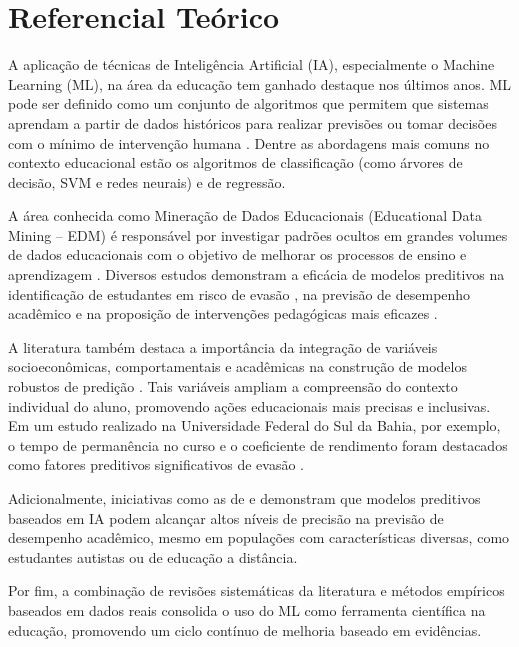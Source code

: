 \documentclass[12pt]{article}
\begin{document}
\section{Referencial Teórico}
A aplicação de técnicas de Inteligência Artificial (IA), especialmente o Machine Learning (ML), na área da educação tem ganhado destaque nos últimos anos. ML pode ser definido como um conjunto de algoritmos que permitem que sistemas aprendam a partir de dados históricos para realizar previsões ou tomar decisões com o mínimo de intervenção humana \cite{Mitchell1997, Goodfellow2016}. Dentre as abordagens mais comuns no contexto educacional estão os algoritmos de classificação (como árvores de decisão, SVM e redes neurais) e de regressão.

A área conhecida como Mineração de Dados Educacionais (Educational Data Mining – EDM) é responsável por investigar padrões ocultos em grandes volumes de dados educacionais com o objetivo de melhorar os processos de ensino e aprendizagem \cite{FilhoVinutoLeal2020}. Diversos estudos demonstram a eficácia de modelos preditivos na identificação de estudantes em risco de evasão \cite{Kantorski2016, Bastos2024}, na previsão de desempenho acadêmico \cite{FernandezGarcia2021} e na proposição de intervenções pedagógicas mais eficazes \cite{Najera2018}.

A literatura também destaca a importância da integração de variáveis socioeconômicas, comportamentais e acadêmicas na construção de modelos robustos de predição \cite{Matz2023}. Tais variáveis ampliam a compreensão do contexto individual do aluno, promovendo ações educacionais mais precisas e inclusivas. Em um estudo realizado na Universidade Federal do Sul da Bahia, por exemplo, o tempo de permanência no curso e o coeficiente de rendimento foram destacados como fatores preditivos significativos de evasão \cite{Bastos2024}.

Adicionalmente, iniciativas como as de \cite{Bakker2023} e \cite{Cabrera2023} demonstram que modelos preditivos baseados em IA podem alcançar altos níveis de precisão na previsão de desempenho acadêmico, mesmo em populações com características diversas, como estudantes autistas ou de educação a distância.

Por fim, a combinação de revisões sistemáticas da literatura \cite{KitchenhamCharters2007, PetticrewRoberts2008} e métodos empíricos baseados em dados reais consolida o uso do ML como ferramenta científica na educação, promovendo um ciclo contínuo de melhoria baseado em evidências.
\end{document}
